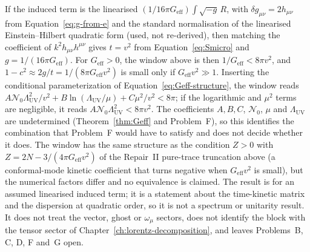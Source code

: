 If the induced term is the linearised \((1/16\pi G_{\mathrm{eff}})\int
\sqrt{-g}\,R\), with \(\delta g_{\mu\nu}=2h_{\mu\nu}\) from
Equation~\eqref{eq:g-from-e} and the standard normalisation of the
linearised Einstein--Hilbert quadratic form (used, not re-derived), then
matching the coefficient of \(k^2h_{\mu\nu}h^{\mu\nu}\) gives
\(t=v^2\) from Equation~\eqref{eq:Smicro} and \(g=1/(16\pi G_{\mathrm{eff}})\).
For \(G_{\mathrm{eff}}>0\), the window above is then
\(1/G_{\mathrm{eff}}<8\pi v^2\), and \(1-c^2\approx 2g/t=1/(8\pi
G_{\mathrm{eff}}v^2)\) is small only if \(G_{\mathrm{eff}}v^2\gg1\).
Inserting the conditional parameterization of
Equation~\eqref{eq:Geff-structure}, the window reads
\(A\mathcal N_0\Lambda_{\mathrm{UV}}^2/v^2+B\ln(\Lambda_{\mathrm{UV}}/\mu)
+C\mu^2/v^2<8\pi\); if the logarithmic and \(\mu^2\) terms are
negligible, it reads \(A\mathcal N_0\Lambda_{\mathrm{UV}}^2<8\pi v^2\).
The coefficients \(A,B,C\), \(\mathcal N_0\), \(\mu\) and
\(\Lambda_{\mathrm{UV}}\) are undetermined (Theorem~\ref{thm:Geff} and
Problem~F), so this identifies the combination that Problem~F would have
to satisfy and does not decide whether it does.  The window has the same
structure as the condition \(Z>0\) with
\(Z=2N-3/(4\pi G_{\mathrm{eff}}v^2)\) of the Repair~II pure-trace
truncation above (a conformal-mode kinetic coefficient that turns
negative when \(G_{\mathrm{eff}}v^2\) is small), but the numerical factors
differ and no equivalence is claimed.  The result is for an assumed
linearised induced term; it is a statement about the time-kinetic matrix
and the dispersion at quadratic order, so it is not a spectrum or
unitarity result.  It does not treat the vector, ghost or \(\omega_\mu\)
sectors, does not identify the block with the tensor sector of
Chapter~\ref{ch:lorentz-decomposition}, and leaves Problems~B, C, D, F
and~G open.

